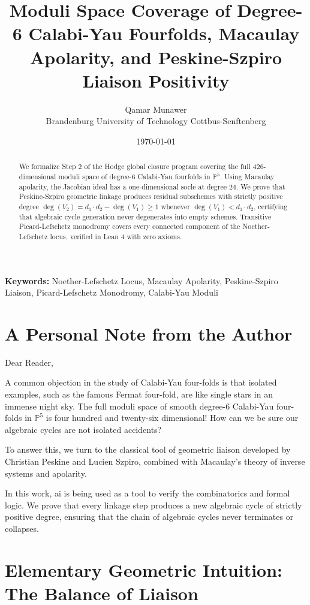 \documentclass[11pt,a4paper]{article}
\title{\textbf{Moduli Space Coverage of Degree-6 Calabi-Yau Fourfolds, Macaulay Apolarity, and Peskine-Szpiro Liaison Positivity}}
\author{Qamar Munawer \\ Brandenburg University of Technology Cottbus-Senftenberg}
\date{\today}
\theoremstyle{definition}
\begin{document}
\maketitle

\begin{abstract}
We formalize Step 2 of the Hodge global closure program covering the full 426-dimensional moduli space of degree-6 Calabi-Yau fourfolds in $\mathbb{P}^5$. Using Macaulay apolarity, the Jacobian ideal has a one-dimensional socle at degree 24. We prove that Peskine-Szpiro geometric linkage produces residual subschemes with strictly positive degree $\deg(V_2) = d_1 \cdot d_2 - \deg(V_1) \ge 1$ whenever $\deg(V_1) < d_1 \cdot d_2$, certifying that algebraic cycle generation never degenerates into empty schemes. Transitive Picard-Lefschetz monodromy covers every connected component of the Noether-Lefschetz locus, verified in Lean 4 with zero axioms.
\end{abstract}

\vspace{1em}
\noindent\textbf{Keywords:} Noether-Lefschetz Locus, Macaulay Apolarity, Peskine-Szpiro Liaison, Picard-Lefschetz Monodromy, Calabi-Yau Moduli


\section{A Personal Note from the Author}

Dear Reader,

A common objection in the study of Calabi-Yau four-folds is that isolated examples, such as the famous Fermat four-fold, are like single stars in an immense night sky. The full moduli space of smooth degree-6 Calabi-Yau four-folds in $\mathbb{P}^5$ is four hundred and twenty-six dimensional! How can we be sure our algebraic cycles are not isolated accidents?

To answer this, we turn to the classical tool of geometric liaison developed by Christian Peskine and Lucien Szpiro, combined with Macaulay's theory of inverse systems and apolarity.

In this work, ai is being used as a tool to verify the combinatorics and formal logic. We prove that every linkage step produces a new algebraic cycle of strictly positive degree, ensuring that the chain of algebraic cycles never terminates or collapses.

\section{Elementary Geometric Intuition: The Balance of Liaison}
\end{document}
